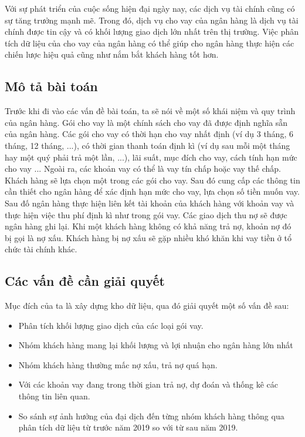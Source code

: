 \documentclass{article}
\begin{document}
\hspace{0.5cm} Với sự phát triển của cuộc sống hiện đại ngày nay, các dịch vụ tài chính cũng có sự tăng trưởng mạnh mẽ. Trong đó, dịch vụ
cho vay của ngân hàng là dịch vụ tài chính được tin cậy và có khối lượng giao dịch lớn nhất trên thị trường. 
Việc phân tích dữ liệu của cho vay của ngân hàng có thể giúp cho ngân hàng thực hiện các chiến lược hiệu quả
cũng như nắm bắt khách hàng tốt hơn.\\

\subsection{Mô tả bài toán}
\hspace{0.5cm} Trước khi đi vào các vấn đề bài toán, ta sẽ nói về một số khái niệm và quy trình của ngân hàng.
Gói cho vay là một chính sách cho vay đã được định nghĩa sẵn của ngân hàng. 
Các gói cho vay có thời hạn cho vay nhất định (ví dụ 3 tháng, 6 tháng, 12 tháng, ...), 
có thời gian thanh toán định kì (ví dụ sau mỗi một tháng hay một quý phải trả một lần, ...), lãi suất, mục đích cho vay,
cách tính hạn mức cho vay ... Ngoài ra, các khoản vay có thể là vay tín chấp hoặc vay thế chấp.\\

Khách hàng sẽ lựa chọn một trong các gói cho vay. Sau đó cung cấp các thông tin cần thiết cho ngân hàng để xác định hạn mức cho vay, lựa chọn số tiền muốn vay. Sau đố ngân hàng thực hiện liên kết tài khoản của khách hàng với khoản vay và thực hiện việc thu phí định kì
như trong gói vay. Các giao dịch thu nợ sẽ được ngân hàng ghi lại. Khi một khách hàng không có khả năng
trả nợ, khoản nợ đó bị gọi là nợ xấu. Khách hàng bị nợ xấu sẽ gặp nhiều khó khăn khi vay tiền ở tổ chức tài chính khác.\\

\subsection{Các vấn đề cần giải quyết}
Mục đích của ta là xây dựng kho dữ liệu, qua đó giải quyết một số vấn đề sau:
\begin{itemize}
    \setlength\itemsep{0.3em}
    \item Phân tích khối lượng giao dịch của các loại gói vay. 
    \item Nhóm khách hàng mang lại khối lượng và lợi nhuận cho ngân hàng lớn nhất
    \item Nhóm khách hàng thường mấc nợ xấu, trả nợ quá hạn. 
    \item Với các khoản vay đang trong thời gian trả nợ, dự đoán và thống kê các thông tin liên quan.
    \item So sánh sự ảnh hưởng của đại dịch đến từng nhóm khách hàng thông qua phân tích dữ liệu từ trước năm 2019 so với từ sau năm 2019. 
\end{itemize}
\newpage
\end{document}
